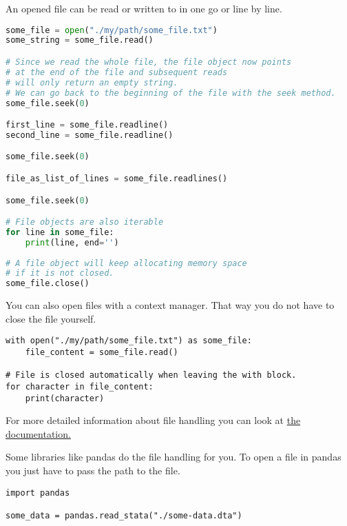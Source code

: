 \documentclass{article}
\begin{document}
An opened file can be read or written to in one go or line by line.

\begin{lstlisting}[language=Python]
some_file = open("./my/path/some_file.txt")
some_string = some_file.read()

# Since we read the whole file, the file object now points
# at the end of the file and subsequent reads
# will only return an empty string.
# We can go back to the beginning of the file with the seek method.
some_file.seek(0)

first_line = some_file.readline()
second_line = some_file.readline()

some_file.seek(0)

file_as_list_of_lines = some_file.readlines()

some_file.seek(0)

# File objects are also iterable
for line in some_file:
    print(line, end='')
 
# A file object will keep allocating memory space
# if it is not closed. 
some_file.close()
\end{lstlisting}

You can also open files with a context manager.
That way you do not have to close the file yourself.

\begin{lstlisting}
with open("./my/path/some_file.txt") as some_file:
    file_content = some_file.read()

# File is closed automatically when leaving the with block.
for character in file_content:
    print(character)
\end{lstlisting}

For more detailed information about file handling you can look at
\href{https://realpython.com/read-write-files-python/}{the documentation.}

Some libraries like pandas do the file handling for you.
To open a file in pandas you just have to pass the path to the file.

\begin{lstlisting}
import pandas

some_data = pandas.read_stata("./some-data.dta")

\end{lstlisting}
\end{document}

